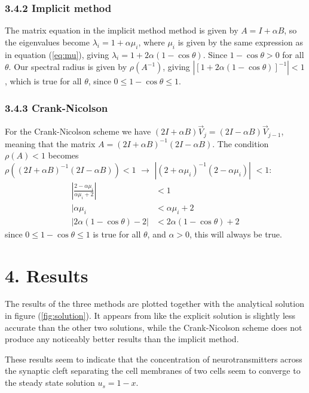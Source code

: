 \documentclass[a4paper,11pt]{report}
\begin{document}
\subsubsection*{3.4.2 Implicit method}

The matrix equation in the implicit method method is given by \( A = I + \alpha B\), so the eigenvalues become \( \lambda_i = 1 + \alpha \mu_i \), where \( \mu_i \) is given by the same expression as in equation (\ref{eq:mu}), giving \( \lambda_i = 1 + 2\alpha (1 - \cos \theta) \). Since \( 1 - \cos \theta >  0\) for all \( \theta \). Our spectral radius is given by \(\rho(A^{-1}) \), giving \( |[1 + 2\alpha (1 - \cos \theta)]^{-1}| < 1\), which is true for all \(\theta\), since \( 0 \le 1 - \cos \theta \le 1\).

\subsubsection*{3.4.3 Crank-Nicolson}

For the Crank-Nicolson scheme we have \( (2I + \alpha B) \vec{V}_j = (2I - \alpha B) \vec{V}_{j-1}\), meaning that the matrix \(A = (2I + \alpha B)^{-1}(2I - \alpha B)\). The condition \(\rho(A) < 1 \) becomes \( \rho((2I + \alpha B)^{-1}(2I - \alpha B)) < 1 \, \, \rightarrow\, \,   |(2 + \alpha \mu_i)^{-1}(2 - \alpha \mu_i)|\, \,  < 1\):
\begin{align*}
\left| \frac{2 - \alpha \mu_i }{\alpha \mu_i +2 }\right| &< 1 \\
| \alpha \mu_i &< \alpha \mu_i + 2 \\
| 2\alpha (1 - \cos \theta) - 2 | &< 2\alpha (1 - \cos \theta) + 2
\end{align*}
since \( 0 \le 1 - \cos \theta \le 1\) is true for all \(\theta\), and \( \alpha > 0\), this will always be true. 

\section*{4. Results}

The results of the three methods are plotted together with the analytical solution in figure (\ref{fig:solution}). It appears from like the explicit solution is slightly less accurate than the other two solutions, while the Crank-Nicolson scheme does not produce any noticeably better results than the implicit method.

These results seem to indicate that the concentration of neurotransmitters across the synaptic cleft separating the cell membranes of two cells seem to converge to the steady state solution \( u_s = 1 - x \).
\end{document}
